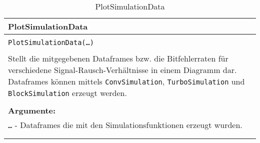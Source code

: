\begin{longtable}{|p{\textwidth}|}
\hline
\rowcolor{lightblue}
PlotSimulationData
\\
\hline
\\
\texttt{PlotSimulationData(\dots)}\\
\\
Stellt die mitgegebenen Dataframes bzw. die Bitfehlerraten für verschiedene Signal-Rausch-Verhältnisse in einem Diagramm dar. Dataframes können mittels \texttt{ConvSimulation}, \texttt{TurboSimulation} und \texttt{BlockSimulation} erzeugt werden.\\
\\
\textbf{Argumente:}\\
\texttt{\dots} - Dataframes die mit den Simulationsfunktionen erzeugt wurden.\\	
\\
\hline
\caption{PlotSimulationData}
\label{funktion:PlotSimulationData}
\end{longtable}